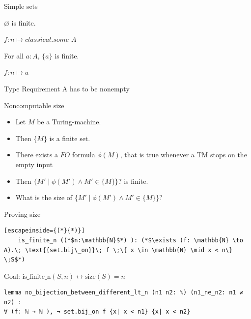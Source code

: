 \documentclass[aspectratio=169]{beamer}
\begin{document}
\begin{frame}[fragile]{Simple sets}
    \begin{lemma}
        $ \varnothing $ is finite.
    \end{lemma}
    $f: n \mapsto classical.some $ $A$
    \begin{lemma}
        For all $a:A$, $\{ a\}$ is finite.
    \end{lemma}
    $f: n \mapsto a$
    \begin{block}{Type Requirement}
    A has to be nonempty
    \end{block}
\end{frame}
\begin{frame}{Noncomputable size}
    \begin{itemize}
        \item Let $M$ be a Turing-machine.
        \item Then $\{M\}$ is a finite set.
        \item There exists a $FO$ formula $\phi(M)$, that is true whenever a TM stops on the empty input
        \item Then $\{ M' \mid \phi (M') \land M' \in \{M\}\}? $ is finite.
        \item What is the size of $\{ M' \mid \phi (M') \land M' \in \{M\}\}? $
    \end{itemize}
\end{frame}

\begin{frame}[fragile]{Proving size} 
\begin{lstlisting}[escapeinside={(*}{*)}]  
    is_finite_n ((*$n:\mathbb{N}$*) ): (*$\exists (f: \mathbb{N} \to A).\; \text{{set.bij\_on}}\; f \;\{ x \in \mathbb{N} \mid x < n\} \;S$*)
\end{lstlisting}

Goal: $\text{is\_finite\_n}(S, n) \leftrightarrow \text{size}(S) = n$

\begin{lstlisting}
lemma no_bijection_between_different_lt_n (n1 n2: ℕ) (n1_ne_n2: n1 ≠ n2) :
∀ (f: ℕ → ℕ ), ¬ set.bij_on f {x| x < n1} {x| x < n2}
\end{lstlisting}

\end{frame}
\end{document}
